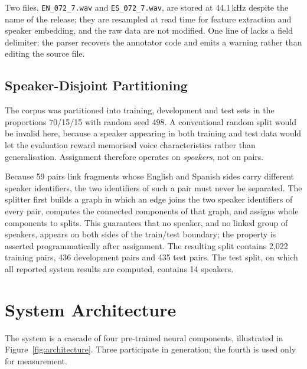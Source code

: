 Two files, \texttt{EN\_072\_7.wav} and \texttt{ES\_072\_7.wav}, are stored at 44.1\,kHz despite the
name of the release; they are resampled at read time for feature extraction and speaker embedding,
and the raw data are not modified. One line of  lacks a field delimiter;
the parser recovers the annotator code and emits a warning rather than editing the source file.

\subsection{Speaker-Disjoint Partitioning}
\label{sec:splits}

The corpus was partitioned into training, development and test sets in the proportions
70/15/15 with random seed 498. A conventional random split would be invalid here, because a speaker
appearing in both training and test data would let the evaluation reward memorised voice
characteristics rather than generalisation. Assignment therefore operates on \emph{speakers}, not
on pairs.

Because 59 pairs link fragments whose English and Spanish sides carry different speaker
identifiers, the two identifiers of such a pair must never be separated. The splitter first builds
a graph in which an edge joins the two speaker identifiers of every pair, computes the connected
components of that graph, and assigns whole components to splits. This guarantees that no speaker,
and no linked group of speakers, appears on both sides of the train/test boundary; the property is
asserted programmatically after assignment. The resulting split contains 2{,}022 training pairs,
436 development pairs and 435 test pairs. The test split, on which all reported system results are
computed, contains 14 speakers.

\section{System Architecture}
\label{sec:architecture}

The system is a cascade of four pre-trained neural components, illustrated in
Figure~\ref{fig:architecture}. Three participate in generation; the fourth is used only for
measurement.

